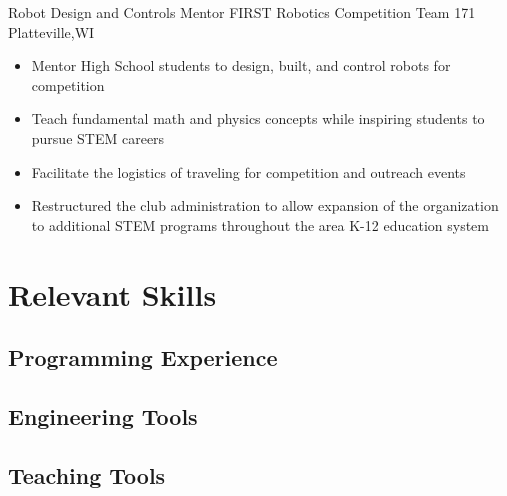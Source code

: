 \documentclass[11pt,letterpaper,roman]{moderncv} %
\begin{document}
{Robot Design and Controls Mentor}
{FIRST Robotics Competition Team 171}
{Platteville,WI}{}{
\begin{itemize}
    \item Mentor High School students to design, built, and control robots for competition
    \item Teach fundamental math and physics concepts while inspiring students to pursue STEM careers
    \item Facilitate the logistics of traveling for competition and outreach events
    \item Restructured the club administration to allow expansion of the organization to additional STEM programs throughout the area K-12 education system
\end{itemize}
}

\section{Relevant Skills}

\subsection{\textbf{Programming Experience}}

\subsection{\textbf{Engineering Tools}}

\subsection{\textbf{Teaching Tools}}

\end{document}
